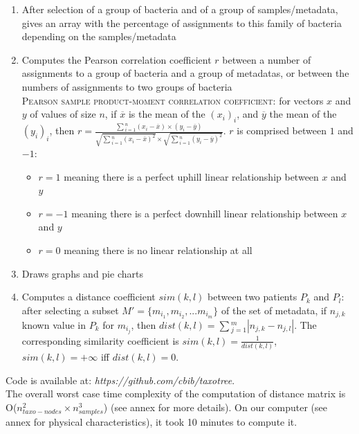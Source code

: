 \documentclass{report}
\begin{document}
\begin{enumerate}
\item After selection of a group of bacteria and of a group of samples/metadata, gives an array with the percentage of assignments to this family of bacteria depending on the samples/metadata
\item Computes the Pearson correlation coefficient $r$ between a number of assignments to a group of bacteria and a group of metadatas, or between the numbers of assignments to two groups of bacteria \\

\textsc{Pearson sample product-moment correlation coefficient:} \cite{Pearson} for vectors $x$ and $y$ of values of size $n$, if $\overline{x}$ is the mean of the $(x_{i})_{i}$, and $\overline{y}$ the mean of the $(y_{i})_{i}$, then $r = \frac{\sum{_{i = 1}^{n}}{(x_{i} - \overline{x}) \times (y_{i} - \overline{y})}}{\sqrt{\sum{_{i = 1}^{n}}{(x_{i} - \overline{x})^{2}}} \times \sqrt{\sum{_{i = 1}^{n}}{(y_{i} - \overline{y})^{2}}}}$. $r$ is comprised between $1$ and $-1$:
\begin{itemize} 
\item $r = 1$ meaning there is a perfect uphill linear relationship between $x$ and $y$
\item $r = -1$ meaning there is a perfect downhill linear relationship between $x$ and $y$
\item $r = 0$ meaning there is no linear relationship at all
\end{itemize}

\item Draws graphs and pie charts
\item Computes a distance coefficient $sim(k,l)$ between two patients $P_{k}$ and $P_{l}$: after selecting a subset $M' = \{ m_{i_{1}}, m_{i_{2}}, ... m_{i_{m}}\}$ of the set of metadata, if $n_{j,k}$ known value in $P_{k}$ for $m_{i_{j}}$, then $dist(k,l) = \sum{_{j = 1}^{m}}{|n_{j,k} - n_{j,l}|}$. The corresponding similarity coefficient is $sim(k,l) = \frac{1}{dist(k,l)}$, $sim(k,l) = +\infty$ iff $dist(k,l) = 0$.
\end{enumerate}

Code is available at: \emph{https://github.com/cbib/taxotree}.\\

The overall worst case time complexity of the computation of distance matrix is O($n_{taxo-nodes}^{2} \times n_{samples}^{3}$) (see annex for more details). On our computer (see annex for physical characteristics), it took 10 minutes to compute it.
\end{document}
